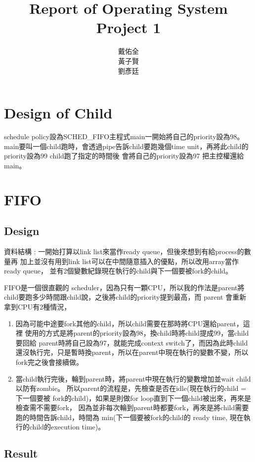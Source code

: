 \documentclass[12pt, a4paper]{article}
\title{Report of Operating System Project 1}
\author{戴佑全\\黃子賢\\劉彥廷}
\begin{document}
\maketitle

\section{Design of Child}
schedule policy設為SCHED\_FIFO主程式main一開始將自己的priority設為98。
main要叫一個child跑時，會透過pipe告訴child要跑幾個time unit，再將此child的priority設為99
child跑了指定的時間後 會將自己的priority設為97 把主控權還給main。

\section{FIFO}
\subsection{Design}

資料結構 : 一開始打算以link list來當作ready queue，但後來想到有給process的數量再
加上並沒有用到link list可以在中間隨意插入的優點，所以改用array當作ready queue，
並有2個變數紀錄現在執行的child與下一個要被fork的child。

FIFO是一個很直觀的 scheduler，因為只有一顆CPU，所以我的作法是parent將
child要跑多少時間跟child說，之後將child的priority提到最高，而 parent
會重新拿到CPU有2種情況，

\begin{enumerate}
  \item 因為可能中途要fork其他的child，所以child需要在那時將CPU還給parent，這裡 使用的方式是將parent的priority設為98，換child時將child提成99，當child要回給 parent時將自己設為97，就能完成context switch了，而因為此時child還沒執行完，只是暫時換parent，所以在parent中現在執行的變數不變，所以fork完之後會接續做。
  \item 當child執行完後，輪到parent時，將parent中現在執行的變數增加並wait child 以防有zombie。 所以parent的流程是，先檢查是否在idle(現在執行的child = 下一個要被 fork的child)，如果是則做for loop直到下一個child被出來，再來是檢查需不需要fork， 因為並非每次輪到parent時都要fork，再來是將child需要跑的時間告訴child，時間為 min(下一個要被fork的child的 ready time, 現在執行的child的execution time)。
\end{enumerate}

\subsection{Result}
\end{document}
